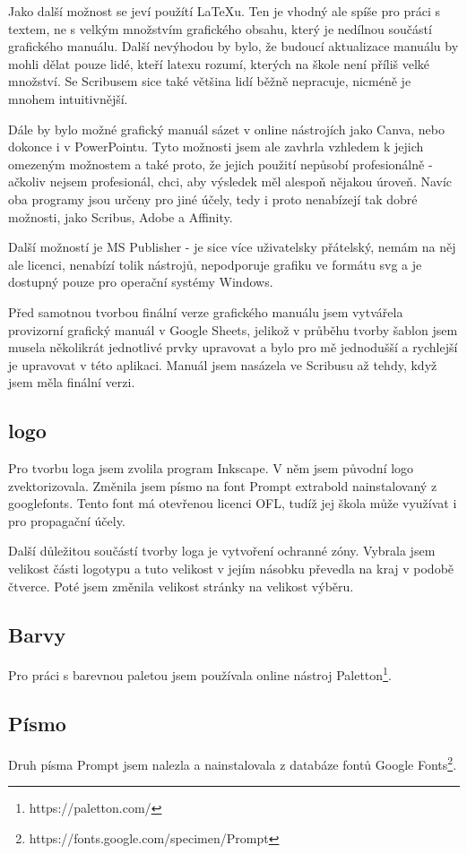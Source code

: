 \documentclass[11pt,a4paper,twoside,openright]{report}
\begin{document}
Jako další možnost se jeví použítí LaTeXu. Ten je vhodný ale spíše pro práci s textem, ne s velkým množstvím grafického obsahu, který je nedílnou součástí grafického manuálu. Další nevýhodou by bylo, že budoucí aktualizace manuálu by mohli dělat pouze lidé, kteří latexu rozumí, kterých na škole není příliš velké množství. Se Scribusem sice také většina lidí běžně nepracuje, nicméně je mnohem intuitivnější.

Dále by bylo možné grafický manuál sázet v online nástrojích jako Canva, nebo dokonce i v PowerPointu. Tyto možnosti jsem ale zavhrla vzhledem k jejich omezeným možnostem a také proto, že jejich použití nepůsobí profesionálně - ačkoliv nejsem profesionál, chci, aby výsledek měl alespoň nějakou úroveň. Navíc oba programy jsou určeny pro jiné účely, tedy i proto nenabízejí tak dobré možnosti, jako Scribus, Adobe a Affinity.

Další možností je MS Publisher - je sice více uživatelsky přátelský, nemám na něj ale licenci, nenabízí tolik nástrojů, nepodporuje grafiku ve formátu svg a je dostupný pouze pro operační systémy Windows. 

Před samotnou tvorbou finální verze grafického manuálu jsem vytvářela provizorní grafický manuál v Google Sheets, jelikož v průběhu tvorby šablon jsem musela několikrát jednotlivé prvky upravovat a bylo pro mě jednodušší a rychlejší je upravovat v této aplikaci. Manuál jsem nasázela ve Scribusu až tehdy, když jsem měla finální verzi.

\subsection{logo}
Pro tvorbu loga jsem zvolila program Inkscape. V něm jsem původní logo zvektorizovala. Změnila jsem písmo na font Prompt extrabold nainstalovaný z googlefonts. Tento font má otevřenou licenci OFL, tudíž jej škola může využívat i pro propagační účely.

Další důležitou součástí tvorby loga je vytvoření ochranné zóny. Vybrala jsem velikost části logotypu a tuto velikost v jejím násobku převedla na kraj v podobě čtverce. Poté jsem změnila velikost stránky na velikost výběru.

\subsection{Barvy}
Pro práci s barevnou paletou jsem používala online nástroj Paletton\footnote{https://paletton.com/}.

\subsection{Písmo}
Druh písma Prompt jsem nalezla a nainstalovala z databáze fontů Google Fonts\footnote{https://fonts.google.com/specimen/Prompt}.
\end{document}
